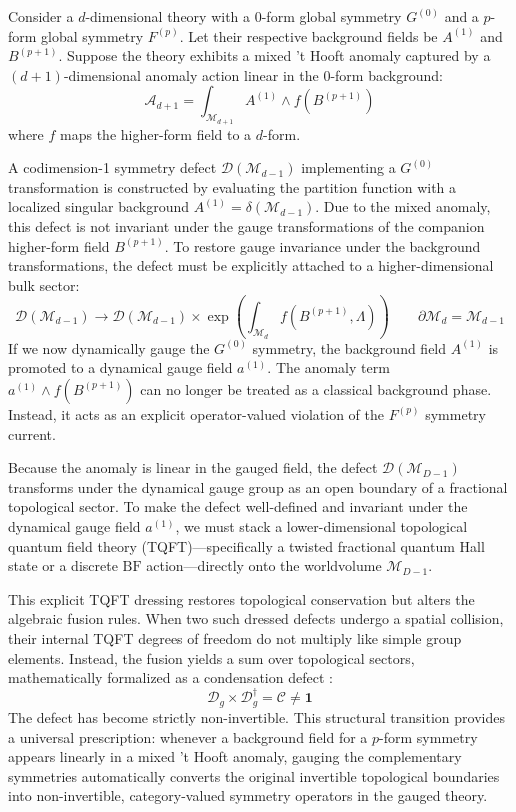 \documentclass[aps,preprint,nofootinbib,preprintnumbers,eqsecnum,superscriptaddress]{revtex4}
\numberwithin{equation}{section}
\begin{document}
Consider a $d$-dimensional theory with a $0$-form global symmetry $G^{(0)}$ and a $p$-form global symmetry $F^{(p)}$. Let their respective background fields be $A^{(1)}$ and $B^{(p+1)}$. Suppose the theory exhibits a mixed 't Hooft anomaly captured by a $(d+1)$-dimensional anomaly action linear in the $0$-form background:
\begin{equation}
    \mathcal{A}_{d+1} = \int_{\mathcal{M}_{d+1}} A^{(1)} \wedge f(B^{(p+1)})
\end{equation}
where $f$ maps the higher-form field to a $d$-form. 

A codimension-1 symmetry defect $\mathcal{D}(\mathcal{M}_{d-1})$ implementing a $G^{(0)}$ transformation is constructed by evaluating the partition function with a localized singular background $A^{(1)} = \delta(\mathcal{M}_{d-1})$. Due to the mixed anomaly, this defect is not invariant under the gauge transformations of the companion higher-form field $B^{(p+1)}$. To restore gauge invariance under the background transformations, the defect must be explicitly attached to a higher-dimensional bulk sector:
\begin{equation}
    \mathcal{D}(\mathcal{M}_{d-1}) \longrightarrow \mathcal{D}(\mathcal{M}_{d-1}) \times \exp \left( \int_{\mathcal{M}_d} f(B^{(p+1)}, \Lambda) \right) \qquad  \partial \mathcal{M}_d = \mathcal{M}_{d-1}
\end{equation}
If we now dynamically gauge the $G^{(0)}$ symmetry, the background field $A^{(1)}$ is promoted to a dynamical gauge field $a^{(1)}$. The anomaly term $a^{(1)} \wedge f(B^{(p+1)})$ can no longer be treated as a classical background phase. Instead, it acts as an explicit operator-valued violation of the $F^{(p)}$ symmetry current. 

Because the anomaly is linear in the gauged field, the defect $\mathcal{D}(\mathcal{M}_{D-1})$ transforms under the dynamical gauge group as an open boundary of a fractional topological sector. To make the defect well-defined and invariant under the dynamical gauge field $a^{(1)}$, we must stack a lower-dimensional topological quantum field theory (TQFT)—specifically a twisted fractional quantum Hall state or a discrete $\text{BF}$ action—directly onto the worldvolume $\mathcal{M}_{D-1}$. 

This explicit TQFT dressing restores topological conservation but alters the algebraic fusion rules. When two such dressed defects undergo a spatial collision, their internal TQFT degrees of freedom do not multiply like simple group elements. Instead, the fusion yields a sum over topological sectors, mathematically formalized as a condensation defect \cite{Roumpedakis_2023}:
\begin{equation}
    \mathcal{D}_g \times \mathcal{D}_g^\dagger = \mathcal{C} \neq \mathbf{1}
\end{equation}
The defect has become strictly non-invertible. This structural transition provides a universal prescription: whenever a background field for a $p$-form symmetry appears linearly in a mixed 't Hooft anomaly, gauging the complementary symmetries automatically converts the original invertible topological boundaries into non-invertible, category-valued symmetry operators in the gauged theory.
\end{document}
